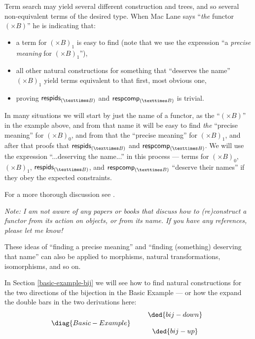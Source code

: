 \documentclass[oneside,12pt]{article}
\begin{document}
Term search may yield several different construction and trees, and so
several non-equivalent terms of the desired type. When Mac Lane says
``{\sl the} functor $(×B)$'' he is indicating that:

\begin{itemize}

\item a term for $(×B)_1$ is easy to find (note that we use the
  expression ``a {\sl precise meaning} for $(×B)_1$''),

\item all other natural constructions for something that ``deserves
  the name'' $(×B)_1$ yield terms equivalent to that first, most
  obvious one,

\item proving $\respids_{(×B)}$ and $\respcomp_{(×B)}$ is trivial.

\end{itemize}

In many situations we will start by just the name of a functor, as the
``$(×B)$'' in the example above, and from that name it will be easy to
find {\sl the} ``precise meaning'' for $(×B)_0$, and from that the
``precise meaning'' for $(×B)_1$, and after that proofs that
$\respids_{(×B)}$ and $\respcomp_{(×B)}$. We will use the expression
``...deserving the name...'' in this process --- terms for $(×B)_0$,
$(×B)_1$, $\respids_{(×B)}$, and $\respcomp_{(×B)}$ ``deserve their
names'' if they obey the expected constraints.

For a more thorough discussion see \cite{IDARCT}.

\msk

{\sl Note: I am not aware of any papers or books that discuss how to
  (re)construct a functor from its action on objects, or from its
  name. If you have any references, please let me know!}

\msk

These ideas of ``finding a precise meaning'' and ``finding (something)
deserving that name'' can also be applied to morphisms, natural
transformations, isomorphisms, and so on.

In Section \ref{basic-example-bij} we will see how to find natural
constructions for the two directions of the bijection in the Basic
Example --- or how the expand the double bars in the two derivations
here:
$$\pu
  \diag{Basic-Example}
  \qquad
  \begin{array}{c}
  \ded{bij-down}
  \\ \\
  \ded{bij-up}
  \end{array}
$$
\end{document}
